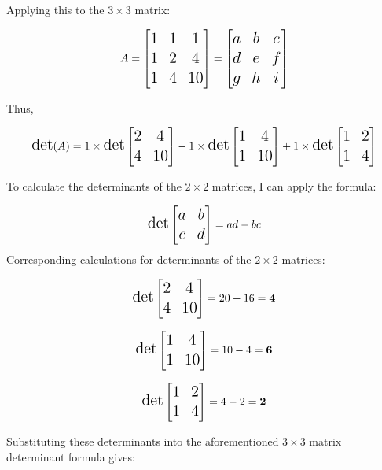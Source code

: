 \documentclass[
]{article}
\begin{document}
Applying this to the \(3 \times 3\) matrix:

\[
\Large
A = \begin{bmatrix}
1 & 1 & 1 \\
1 & 2 & 4 \\
1 & 4 & 10 
\end{bmatrix}
=
\begin{bmatrix}
a & b & c \\
d & e & f \\
g & h & i 
\end{bmatrix}
\]

Thus,

\[
\Large
\text{det}(A) =
1 \times \text{det} \begin{bmatrix} 2 & 4 \\ 4 & 10 \end{bmatrix} - 1 \times \text{det} \begin{bmatrix} 1 & 4 \\ 1 & 10 \end{bmatrix} + 1 \times \text{det} \begin{bmatrix} 1 & 2 \\ 1 & 4 \end{bmatrix}
\]

To calculate the determinants of the \(2 \times 2\) matrices, I can
apply the formula:

\[
\Large
\text{det}\begin{bmatrix} a & b \\ c & d \end{bmatrix} = ad - bc
\] Corresponding calculations for determinants of the \(2 \times 2\)
matrices:

\[
\Large
\text{det} 
 \begin{bmatrix} 2 & 4 \\ 4 & 10 \end{bmatrix} = 20 - 16 =\mathbf{4}
\]

\[
\Large
 \text{det} \begin{bmatrix} 1 & 4 \\ 1 & 10 \end{bmatrix} = 10 - 4 =\mathbf{6}
\]

\[
\Large
 \text{det} \begin{bmatrix} 1 & 2 \\ 1 & 4 \end{bmatrix} = 4-2 = \mathbf{2}
\]

Substituting these determinants into the aforementioned \(3 \times 3\)
matrix determinant formula gives:
\end{document}
